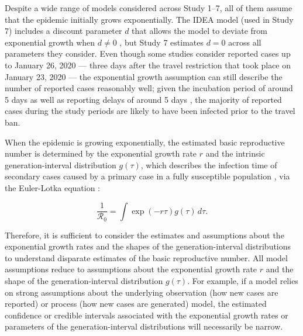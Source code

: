 \documentclass[12pt]{article}
\newcommand{\Ro}{\ensuremath{{\mathcal R}_{0}}\xspace}
\begin{document}
Despite a wide range of models considered across Study 1--7, all of them assume that the epidemic initially grows exponentially.
The IDEA model (used in Study 7) includes a discount parameter $d$ that allows the model to deviate from exponential growth when $d \neq 0$ \citep{fisman2013idea}, but Study 7 estimates $d=0$ across all parameters they consider.
Even though some studies consider reported cases up to January 26, 2020 --- three days after the travel restriction that took place on January 23, 2020 \citep{Tianeabb6105} --- the exponential growth assumption can still describe the number of reported cases reasonably well;
given the incubation period of around 5 days \citep{lauer2020incubation} as well as reporting delays of around 5 days \citep{sun2020early}, the majority of reported cases during the study periods are likely to have been infected prior to the travel ban.

When the epidemic is growing exponentially, the estimated basic reproductive number is determined by the exponential growth rate $r$ and the intrinsic generation-interval distribution $g(\tau)$, which describes the infection time of secondary cases caused by a primary case in a fully susceptible population \citep{champredon2015intrinsic}, via the Euler-Lotka equation \citep{wallinga2007generation}:
\begin{linenomath*}
\begin{equation}
\frac{1}{\Ro} = \int \exp(-r\tau) g(\tau) \, d\tau.
\label{eq:euler}
\end{equation}
\end{linenomath*}
Therefore, it is sufficient to consider the estimates and assumptions about the exponential growth rates and the shapes of the generation-interval distributions to understand disparate estimates of the basic reproductive number.
All model assumptions reduce to assumptions about the exponential growth rate $r$ and the shape of the generation-interval distribution $g(\tau)$.
For example, if a model relies on strong assumptions about the underlying observation (how new cases are reported) or process (how new cases are generated) model, the estimated confidence or credible intervals associated with the exponential growth rates or parameters of the generation-interval distributions will necessarily be narrow.
\end{document}
